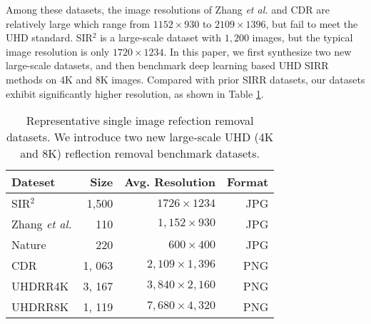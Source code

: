 \documentclass[10pt,journal]{IEEEtran}
\begin{document}
Among these datasets, the image resolutions of Zhang \textit{et al.} \cite{zhangSingleImageReflection2018} and CDR \cite{leiCategorizedReflectionRemoval2022} are relatively large which range from $1152 \times 930$ to $2109 \times 1396$, but fail to meet the UHD standard. SIR$^2$ \cite{wanBenchmarkingSingleimageReflection2017} is a large-scale dataset with $1,200$ images, but the typical image resolution is only $1720 \times 1234$. 
In this paper, we first synthesize two new large-scale datasets, and then benchmark deep learning based UHD SIRR methods on 4K and 8K images. 
Compared with prior SIRR datasets, our datasets exhibit significantly higher resolution, as shown in Table \ref{table_dataset}.


\begin{table}[!t]
	\centering
	\caption{Representative single image refection removal datasets. We introduce two new large-scale UHD (4K and 8K) reflection removal benchmark datasets.}
	\label{table_dataset}
	\begin{tabular}{l|rrr}
		\toprule
		Dateset& Size & Avg. Resolution & Format\\
		\midrule
		SIR$^2$ \cite{wanBenchmarkingSingleimageReflection2017}&1,500&$1726\times1234$&JPG\\
		Zhang \textit{et al.} \cite{zhangSingleImageReflection2018}&110&$1, 152\times930$&JPG\\
		Nature \cite{liSingleImageReflection2020}&220&$600\times400$&JPG\\
		CDR \cite{leiCategorizedReflectionRemoval2022}&1, 063&$2, 109\times1, 396$&PNG\\
		\midrule
		UHDRR4K&3, 167&$3, 840\times2, 160$&PNG\\
		UHDRR8K&1, 119&$7, 680\times4, 320$&PNG\\
		\bottomrule
	\end{tabular}
\end{table}
\end{document}
